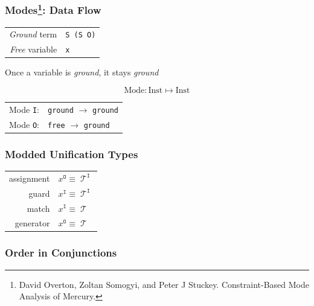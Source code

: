 \documentclass[xcolor={dvipsnames}, aspectratio=169]{beamer}
\DeclareMathOperator{\Term}{\mathcal{T}}
\DeclareMathOperator{\inmode}{\mathtt{I}}
\DeclareMathOperator{\outmode}{\mathtt{O}}
\begin{document}
\begin{frame}[fragile]
  \frametitle{Modes\footnote{David Overton, Zoltan Somogyi, and Peter J Stuckey. Constraint-Based Mode Analysis of Mercury. }: Data Flow}
\begin{center}

\begin{tabular}{rl}
    \emph{Ground} term & \lstinline|S (S O)| \\
  \emph{Free} variable & \lstinline|x|
\end{tabular}

\vfill

Once a variable is \emph{ground}, it stays \emph{ground}
\end{center}

\vfill

\begin{center}
\[ \text{Mode} : \text{Inst} \mapsto \text{Inst} \] 
\vfill

\begin{tabular}{rl}
  Mode \lstinline|I|: & \lstinline|ground| $\rightarrow$ \lstinline|ground| \\
  Mode \lstinline|O|: & \lstinline|free| $\rightarrow$ \lstinline|ground|
\end{tabular}
\end{center}

\end{frame}

\begin{frame}[fragile]
  \frametitle{Modded Unification Types}

\begin{center}
\begin{tabular}{rl}
  assignment & $x^{\outmode} \equiv \Term^{\inmode} $ \\
  guard      & $x^{\inmode}  \equiv \Term^{\inmode} $ \\
  match      & $x^{\inmode}  \equiv \Term           $ \\
  generator  & $x^{\outmode} \equiv \Term           $
\end{tabular}
\end{center}

\end{frame}

\begin{frame}[fragile]
  \frametitle{Order in Conjunctions}



\end{frame}
\end{document}
